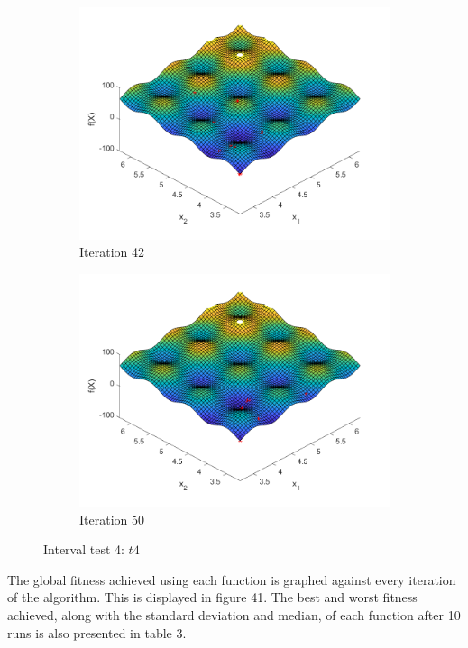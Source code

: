 \begin{figure}
\begin{subfigure}[b]{0.4\textwidth}
   \includegraphics[width=\textwidth]{img/smpl/rast2dshft/loa-iter-42}
   \caption{Iteration 42}
   \label{fig:i4-iter-6}
 \end{subfigure}
 \begin{subfigure}[b]{0.4\textwidth}
   \includegraphics[width=\textwidth]{img/smpl/rast2dshft/loa-iter-50}
   \caption{Iteration 50}
   \label{fig:i4-iter-7}
 \end{subfigure}
 \caption{Interval test 4: $t4$}
\end{figure}

\par The global fitness achieved using each function is graphed against every iteration of the algorithm. This is displayed in figure 41. The best and worst fitness achieved, along with the standard deviation and median, of each function after 10 runs is also presented in table 3. \par

